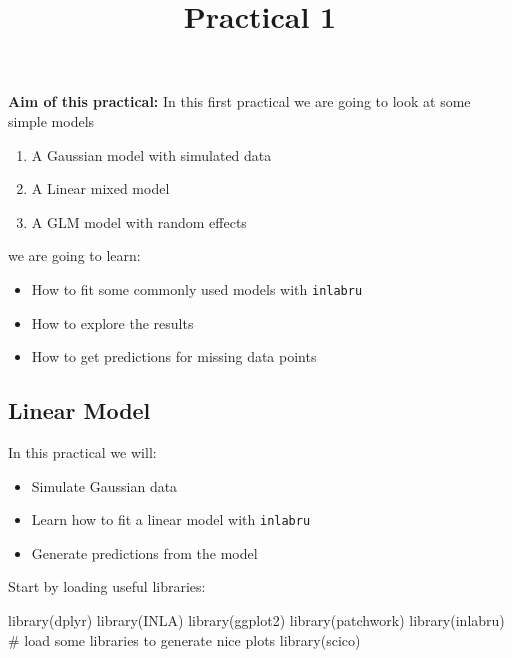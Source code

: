 \documentclass[
  letterpaper,
  DIV=11,
  numbers=noendperiod]{scrartcl}
\title{Practical 1}
\author{}
\date{}
\makeatletter
\newenvironment{Shaded}{\begin{snugshade}}{\end{snugshade}}
\newcommand{\CommentTok}[1]{\textcolor[rgb]{0.37,0.37,0.37}{#1}}
\newcommand{\FunctionTok}[1]{\textcolor[rgb]{0.28,0.35,0.67}{#1}}
\newcommand{\NormalTok}[1]{\textcolor[rgb]{0.00,0.23,0.31}{#1}}
\providecommand{\tightlist}{%
  \setlength{\itemsep}{0pt}\setlength{\parskip}{0pt}}\usepackage{longtable,booktabs,array}
\renewcommand{\maketitle}{\bgroup\setlength{\parindent}{0pt}
\begin{flushleft}
  {\sffamily\huge\textbf{\MakeUppercase{\@title}}} \vspace{0.3cm} \newline
  {\Large {\@subtitle}} \newline
  \@author
\end{flushleft}\egroup
}
\makeatother
\begin{document}
\maketitle

\pagestyle{mystyle}

\textbf{Aim of this practical:} In this first practical we are going to
look at some simple models

\begin{enumerate}
\def\labelenumi{\arabic{enumi}.}
\tightlist
\item
  A Gaussian model with simulated data
\item
  A Linear mixed model
\item
  A GLM model with random effects
\end{enumerate}

we are going to learn:

\begin{itemize}
\tightlist
\item
  How to fit some commonly used models with \texttt{inlabru}
\item
  How to explore the results
\item
  How to get predictions for missing data points
\end{itemize}

\subsection{Linear Model}\label{sec-linmodel}

In this practical we will:

\begin{itemize}
\tightlist
\item
  Simulate Gaussian data
\item
  Learn how to fit a linear model with \texttt{inlabru}
\item
  Generate predictions from the model
\end{itemize}

Start by loading useful libraries:

\begin{Shaded}
\begin{Highlighting}[]
\FunctionTok{library}\NormalTok{(dplyr)}
\FunctionTok{library}\NormalTok{(INLA)}
\FunctionTok{library}\NormalTok{(ggplot2)}
\FunctionTok{library}\NormalTok{(patchwork)}
\FunctionTok{library}\NormalTok{(inlabru)     }
\CommentTok{\# load some libraries to generate nice plots}
\FunctionTok{library}\NormalTok{(scico)}
\end{Highlighting}
\end{Shaded}
\end{document}
